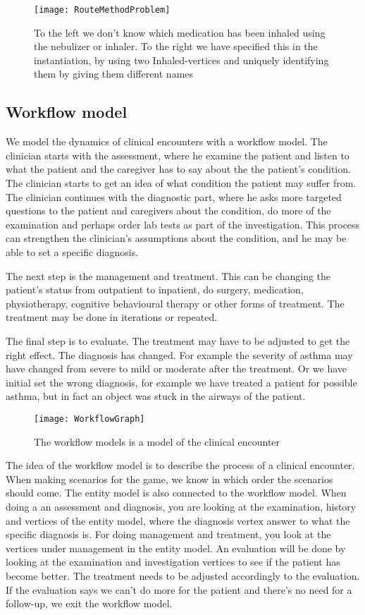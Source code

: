 \begin{figure}[h!]
	\texttt{[image: RouteMethodProblem]}
	\caption {To the left we don't know which medication has been inhaled using the nebulizer or inhaler. To the right we have specified this in the instantiation, by using two Inhaled-vertices and uniquely identifying them by giving them different names}
		\label{fig:RouteMethodProblem}
\end{figure}


\subsection{Workflow model}
We model the dynamics of clinical encounters with a workflow model. The clinician starts with the assessment, where he examine the patient and listen to what the patient and the caregiver has to say about the the patient's condition. The clinician starts to get an idea of what condition the patient may suffer from. The clinician continues with the diagnostic part, where he asks more targeted questions to the patient and caregivers about the condition, do more of the examination and perhaps order lab tests as part of the investigation. This process can strengthen the clinician's assumptions about the condition, and he may be able to set a specific diagnosis.

The next step is the management and treatment. This can be changing the patient's status from outpatient to inpatient, do surgery, medication, physiotherapy, cognitive behavioural therapy or other forms of treatment. The treatment may be done in iterations or repeated.


The final step is to evaluate. The treatment may have to be adjusted to get the right effect. The diagnosis has changed. For example the severity of asthma may have changed from severe to mild or moderate after the treatment. Or we have initial set the wrong diagnosis, for example we have treated a patient for possible asthma, but in fact an object was stuck in the airways of the patient.


\begin{figure}[h!]
	\texttt{[image: WorkflowGraph]}
	\caption {The workflow models is a model of the clinical encounter}
		\label{fig:WorkflowGraph}
\end{figure}

The idea of the workflow model is to describe the process of a clinical encounter. When making scenarios for the game, we know in which order the scenarios should come. The entity model is also connected to the workflow model. When doing a an assessment and diagnosis, you are looking at the examination, history and vertices of the entity model, where the diagnosis vertex answer to what the specific diagnosis is. For doing management and treatment, you look at the vertices under management in the entity model. An evaluation will be done by looking at the examination and investigation vertices to see if the patient has become better. The treatment needs to be adjusted accordingly to the evaluation. If the evaluation says we can't do more for the patient and there's no need for a follow-up, we exit the workflow model.


